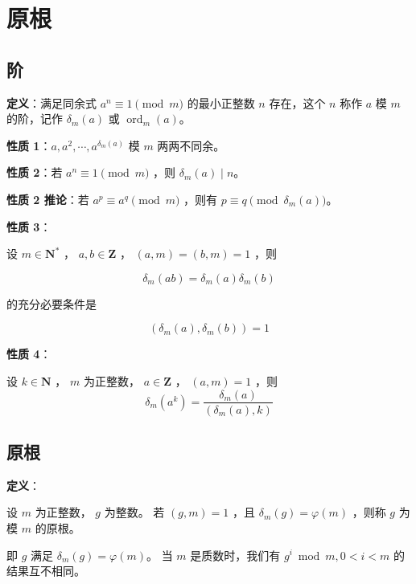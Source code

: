 \section{原根}

\subsection{阶}

\begin{tcolorbox}
\textbf{定义}：满足同余式 $a^n \equiv 1 \pmod m$ 的最小正整数 $n$ 存在，这个 $n$ 称作 $a$ 模 $m$ 的阶，记作 $\delta_m(a)$ 或 $\operatorname{ord}_m(a)$。
\end{tcolorbox}

\begin{tcolorbox}
\textbf{性质 1}：$a,a^2,\cdots,a^{\delta_m(a)}$ 模 $m$ 两两不同余。
\end{tcolorbox}

\begin{tcolorbox}
\textbf{性质 2}：若 $a^n \equiv 1 \pmod m$ ，则 $\delta_m(a)\mid n$。
\end{tcolorbox}

\begin{tcolorbox}
\textbf{性质 2 推论}：若 $a^p\equiv a^q\pmod m$ ，则有 $p\equiv q\pmod{\delta_m(a)}$。
\end{tcolorbox}

\begin{tcolorbox}
\textbf{性质 3}：

设 $m\in\mathbf{N}^{*}$ ， $a,b\in\mathbf{Z}$ ， $(a,m)=(b,m)=1$ ，则

$$\delta_m(ab)=\delta_m(a)\delta_m(b)$$

的充分必要条件是

$$\left(\delta_m(a), \delta_m(b)\right)=1$$
\end{tcolorbox}

\begin{tcolorbox}
\textbf{性质 4}：

设 $k \in \mathbf{N}$ ， $m$ 为正整数， $a\in\mathbf{Z}$ ， $(a,m)=1$ ，则
$$\delta_m(a^k)=\dfrac{\delta_m(a)}{\left(\delta_m(a),k\right)}$$
\end{tcolorbox}

\subsection{原根}


\begin{tcolorbox}
\textbf{定义}：

设 $m$ 为正整数， $g$ 为整数。 若 $(g,m)=1$ ，且 $\delta_m(g)=\varphi(m)$ ，则称 $g$ 为模 $m$ 的原根。

即 $g$ 满足
$\delta_m(g) = \varphi(m)$。 当 $m$ 是质数时，我们有 $g^i \bmod m,0 < i < m$ 的结果互不相同。
\end{tcolorbox}


